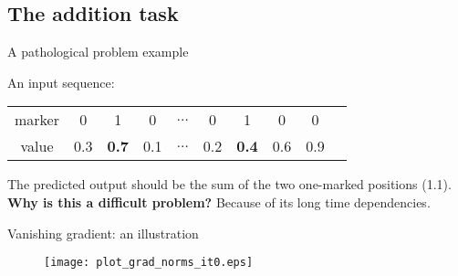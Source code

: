 \subsection{The addition task}
\begin{frame}{A pathological problem example}
	
	
	An input sequence:
	
	\vspace{1em}
	
	\begin{tabular}{|c|c|c|c|c|c|c|c|c|c}
		\hline  marker & 0&  1&  0&  $\hdots$& 0 & 1 & 0 & 0  \\ 
		value & 0.3&  \textbf{0.7}&  0.1&  $\hdots$& 0.2& \textbf{0.4} & 0.6& 0.9  \\ 
		\hline 
	\end{tabular}
	
	\vspace{1em}
	The predicted output should be the sum of the two one-marked positions (1.1). 
	\pause
	\vspace{1em}
\\
\textbf{Why is this a difficult problem?}
		Because of its long time dependencies.
	
\end{frame}

\begin{frame}{Vanishing gradient: an illustration}
	\begin{figure}
		\centering
		\texttt{[image: plot\_grad\_norms\_it0.eps]}
	\end{figure}
\end{frame}


